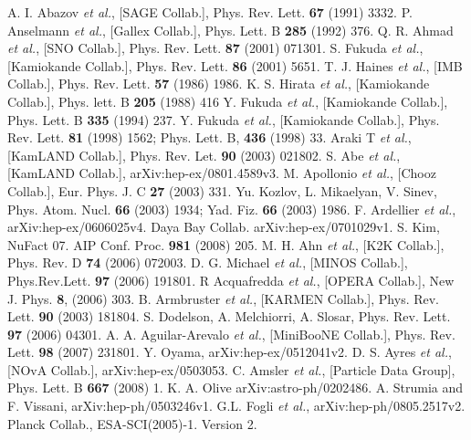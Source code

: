 \begin{thebibliography}{99}
A. I. Abazov \textit{et al.}, [SAGE Collab.], Phys.   Rev. Lett. \textbf{67} (1991) 3332.
P. Anselmann \textit{et al.}, [Gallex Collab.], Phys.   Lett. B \textbf{285} (1992) 376.
Q. R. Ahmad \textit{et al.}, [SNO Collab.], Phys. Rev.   Lett. \textbf{87} (2001) 071301.
S. Fukuda \textit{et al.}, [Kamiokande Collab.], Phys.   Rev. Lett. \textbf{86} (2001) 5651.
T. J. Haines \textit{et al.}, [IMB Collab.], Phys. Rev.  
Lett. \textbf{57} (1986) 1986.
K. S. Hirata \textit{et al.}, [Kamiokande Collab.],  
Phys. lett. B \textbf{205} (1988) 416
Y. Fukuda \textit{et al.}, [Kamiokande Collab.], Phys.  
Lett. B \textbf{335} (1994) 237.
Y. Fukuda \textit{et al.}, [Kamiokande Collab.], Phys.  
Rev. Lett. \textbf{81} (1998) 1562; Phys. Lett. B, \textbf{436}  
(1998) 33.
Araki T \textit{et al.}, [KamLAND Collab.], Phys. Rev.   Let. \textbf{90} (2003) 021802.
S. Abe \textit{et al.}, [KamLAND Collab.],   arXiv:hep-ex/0801.4589v3.
M. Apollonio \textit{et al.}, [Chooz Collab.], Eur.   Phys. J. C \textbf{27} (2003) 331.
Yu. Kozlov, L. Mikaelyan, V. Sinev, Phys. Atom. Nucl.   \textbf{66} (2003) 1934; Yad. Fiz. \textbf{66} (2003) 1986.
F. Ardellier \textit{et al.}, arXiv:hep-ex/0606025v4.
Daya Bay Collab. arXiv:hep-ex/0701029v1.
S. Kim, NuFact 07. AIP Conf. Proc. \textbf{981} (2008)   205.
M. H. Ahn \textit{et al.}, [K2K Collab.], Phys. Rev. D   \textbf{74} (2006) 072003.
D. G. Michael \textit{et al.}, [MINOS Collab.],   Phys.Rev.Lett. \textbf{97} (2006) 191801.
R Acquafredda \textit{et al.}, [OPERA Collab.], New J. Phys. \textbf{8}, (2006) 303.
B. Armbruster \textit{et al.}, [KARMEN Collab.], Phys. Rev. Lett. \textbf{90} (2003) 181804.
S. Dodelson, A. Melchiorri, A. Slosar, Phys. Rev. Lett.   \textbf{97} (2006) 04301.
A. A. Aguilar-Arevalo \textit{et al.}, [MiniBooNE   Collab.], Phys. Rev. Lett. \textbf{98} (2007) 231801.
Y. Oyama, arXiv:hep-ex/0512041v2.
D. S. Ayres \textit{et al.}, [NOvA Collab.],   arXiv:hep-ex/0503053.
C. Amsler \textit{et al.}, [Particle Data Group], Phys. Lett. B \textbf{667} (2008) 1.
K. A. Olive arXiv:astro-ph/0202486.
A. Strumia and F. Vissani, arXiv:hep-ph/0503246v1.
G.L. Fogli \textit{et al.}, arXiv:hep-ph/0805.2517v2.
Planck Collab., ESA-SCI(2005)-1. Version 2.

\end{thebibliography}
